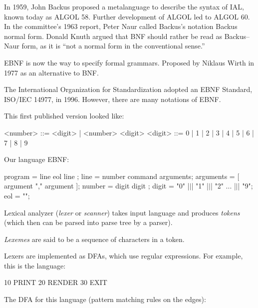 \documentclass{article}
\begin{document}

\pptToc


In 1959, John Backus proposed a metalanguage to describe the syntax of IAL, known today as ALGOL 58. Further development of ALGOL led to ALGOL 60. In the committee's 1963 report, Peter Naur called Backus's notation Backus normal form. Donald Knuth argued that BNF should rather be read as Backus–Naur form, as it is ``not a normal form in the conventional sense.''

EBNF is now the way to specify formal grammars. Proposed by Niklaus Wirth in 1977 as an alternative to BNF.

The International Organization for Standardization adopted an EBNF Standard, ISO/IEC 14977, in 1996. However, there are many notations of EBNF.
\plush{}

This first published version looked like:
\begin{ffcode}
<number> ::= <digit> | <number> <digit>
<digit> ::= 0 | 1 | 2 | 3 | 4 | 5 | 6 | 7 | 8 | 9
\end{ffcode}
\plush{}

Our language EBNF:
\begin{ffcode}
program = line { eol line };
line = number command arguments;
arguments = [ argument { "," argument } ];
number = digit { digit };
digit = "0" |$\vert$| "1" |$\vert$| "2" ... |$\vert$| "9";
eol = "\n";
\end{ffcode}
\plush{}


Lexical analyzer (\emph{lexer} or \emph{scanner}) takes input language and produces \emph{tokens} (which then can be parsed into parse tree by a parser).

\emph{Lexemes} are said to be a sequence of characters in a token.
\plush{}

Lexers are implemented as DFAs, which use regular expressions. For example, this is the language:
\begin{ffcode}
10 PRINT
20 RENDER
30 EXIT
\end{ffcode}
\plush{}

The DFA for this language (pattern matching rules on the edges): \\
\end{document}
